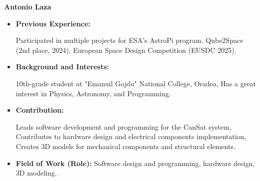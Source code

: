 \item[] \textbf{Antonio Laza}
    \begin{itemize}[label=]
        \item[\faCogs] \textbf{Previous Experience:} 
            \begin{itemize}[label=\textbullet]
                \myitemtwo Participated in multiple projects for ESA's AstroPi program.
                \myitemtwo  Qube2Space (2nd place, 2024),
                \myitemtwo European Space Design Competition (EUSDC 2025).
            \end{itemize}
        \item[\faGraduationCap] \textbf{Background and Interests:} 
            \begin{itemize}[label=\textbullet]
                \myitemtwo 10th-grade student at "Emanuil Gojdu" National College, Oradea,
                \myitemtwo Has a great interest in Physics, Astronomy, and Programming.
            \end{itemize}
        \item[\faEdit] \textbf{Contribution:}
            \begin{itemize}[label=\textbullet]
            \myitemtwo Leads software development and programming for the CanSat system,
            \myitemtwo Contributes to hardware design and electrical components implementation,
            \myitemtwo Creates 3D models for mechanical components and structural elements.
            \end{itemize}
        \item[\faMicroscope] \textbf{Field of Work (Role):} Software design and programming, hardware design, 3D modeling.
    \end{itemize}
    \vspace{0.2 cm}
    
